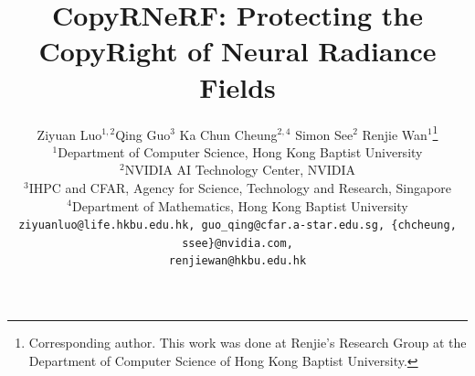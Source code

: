 \documentclass[10pt,twocolumn,letterpaper]{article}
\begin{document}
\title{CopyRNeRF: Protecting the CopyRight of Neural Radiance Fields}


\author{Ziyuan Luo$^{1,2}$\quad Qing Guo$^{3}$ \quad Ka Chun Cheung$^{2, 4}$ \quad Simon See$^{2}$ \quad Renjie Wan$^{1}$\thanks{Corresponding author. This work was done at Renjie's Research Group at the Department of Computer Science of Hong Kong Baptist University.}\\
$^{1}$\small{Department of Computer Science, Hong Kong Baptist University}\\
$^{2}$\small{NVIDIA AI Technology Center, NVIDIA}\\
$^{3}$\small{IHPC and CFAR, Agency for Science, Technology and Research, Singapore}\\
$^{4}$\small{Department of Mathematics, Hong Kong Baptist University}\\
{\tt\small ziyuanluo@life.hkbu.edu.hk, guo_qing@cfar.a-star.edu.sg, \{chcheung, ssee\}@nvidia.com,}\\ {\tt\small renjiewan@hkbu.edu.hk}
}


\maketitle
\ificcvfinal\thispagestyle{empty}\fi
\end{document}
